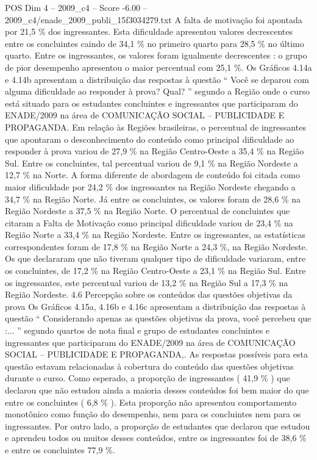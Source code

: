\begin{textsample}{POS Dim 4 – 2009\_c4 – Score -6.00 – 2009\_c4/enade\_2009\_publi\_15f3034279.txt}
A falta de motivação foi apontada por 21,5 \% dos ingressantes.
Esta dificuldade apresentou valores decrescentes entre os concluintes caindo de 34,1 \% no primeiro quarto para 28,5 \% no último quarto.
Entre os ingressantes, os valores foram igualmente decrescentes : o grupo de pior desempenho apresentou o maior percentual com 25,1 \%.
Os Gráficos 4.14a e 4.14b apresentam a distribuição das respostas à questão “ Você se deparou com alguma dificuldade ao responder à prova?
Qual? ” segundo a Região onde o curso está situado para os estudantes concluintes e ingressantes que participaram do ENADE/2009 na área de COMUNICAÇÃO SOCIAL – PUBLICIDADE E PROPAGANDA.
Em relação às Regiões brasileiras, o percentual de ingressantes que apontaram o desconhecimento do conteúdo como principal dificuldade ao responder à prova variou de 27,9 \% na Região Centro-Oeste a 35,4 \% na Região Sul.
Entre os concluintes, tal percentual variou de 9,1 \% na Região Nordeste a 12,7 \% na Norte.
A forma diferente de abordagem de conteúdo foi citada como maior dificuldade por 24,2 \% dos ingressantes na Região Nordeste chegando a 34,7 \% na Região Norte.
Já entre os concluintes, os valores foram de 28,6 \% na Região Nordeste a 37,5 \% na Região Norte.
O percentual de concluintes que citaram a Falta de Motivação como principal dificuldade variou de 23,4 \% na Região Norte a 33,4 \% na Região Nordeste.
Entre os ingressantes, as estatísticas correspondentes foram de 17,8 \% na Região Norte a 24,3 \%, na Região Nordeste.
Os que declararam que não tiveram qualquer tipo de dificuldade variaram, entre os concluintes, de 17,2 \% na Região Centro-Oeste a 23,1 \% na Região Sul.
Entre os ingressantes, este percentual variou de 13,2 \% na Região Sul a 17,3 \% na Região Nordeste. 4.6 Percepção sobre os conteúdos das questões objetivas da prova Os Gráficos 4.15a, 4.16b e 4.16c apresentam a distribuição das respostas à questão “ Considerando apenas as questões objetivas da prova, você percebeu que :... ” segundo quartos de nota final e grupo de estudantes concluintes e ingressantes que participaram do ENADE/2009 na área de COMUNICAÇÃO SOCIAL – PUBLICIDADE E PROPAGANDA,.
As respostas possíveis para esta questão estavam relacionadas à cobertura do conteúdo das questões objetivas durante o curso.
Como esperado, a proporção de ingressantes ( 41,9 \% ) que declarou que não estudou ainda a maioria desses conteúdos foi bem maior do que entre os concluintes ( 6,8 \% ).
Esta proporção não apresentou comportamento monotônico como função do desempenho, nem para os concluintes nem para os ingressantes.
Por outro lado, a proporção de estudantes que declarou que estudou e aprendeu todos ou muitos desses conteúdos, entre os ingressantes foi de 38,6 \% e entre os concluintes 77,9 \%.

\end{textsample}
